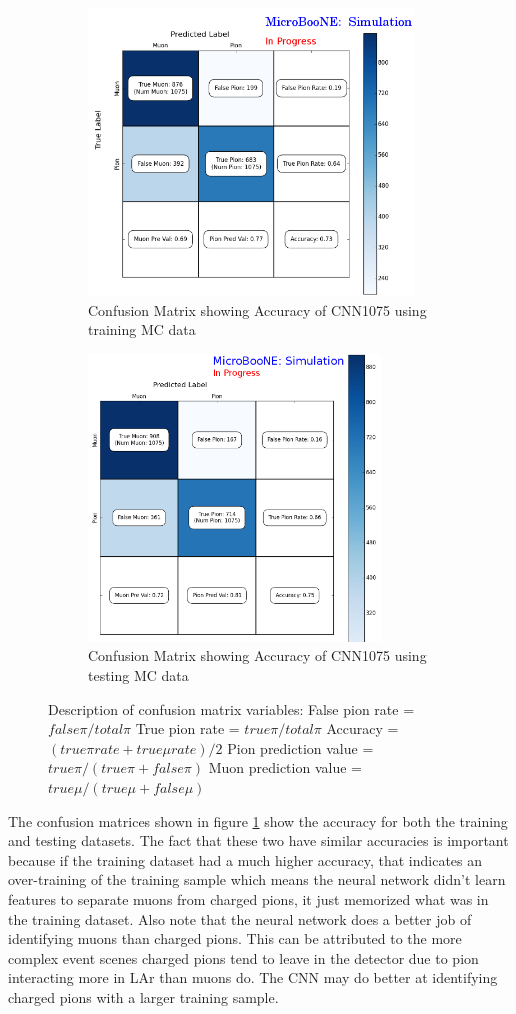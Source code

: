 \begin{figure}[htp!]
\centering
	\begin{subfigure}[b]{.68\textwidth}
	\includegraphics[width=\textwidth,height=3in]{figs/confusion1_train.png}
	\caption{Confusion Matrix showing Accuracy of CNN1075 using training MC data}
	\end{subfigure}
	\quad
	\begin{subfigure}[b]{.6\textwidth}
	\includegraphics[width=\textwidth,height=3in]{figs/confusion1_test.png}
	\caption{Confusion Matrix showing Accuracy of CNN1075 using testing MC data}
	\end{subfigure}
	\quad
\caption{Description of confusion matrix variables: False pion rate = $false \pi/ total \pi$ True pion rate = $true \pi/total \pi$ Accuracy = $(true \pi rate + true \mu rate)/2$ Pion prediction value = $true \pi/(true \pi + false \pi)$ Muon prediction value = $true \mu/(true \mu + false \mu)$}
\label{fig:confusion1075}
\end{figure}

The confusion matrices shown in figure \ref{fig:confusion1075} show the accuracy for both the training and testing datasets. The fact that these two have similar accuracies is important because if the training dataset had a much higher accuracy, that indicates an over-training of the training sample which means the neural network didn't learn features to separate muons from charged pions, it just memorized what was in the training dataset. Also note that the neural network does a better job of identifying muons than charged pions. This can be attributed to the more complex event scenes charged pions tend to leave in the detector due to pion interacting more in LAr than muons do. The CNN may do better at identifying charged pions with a larger training sample.

